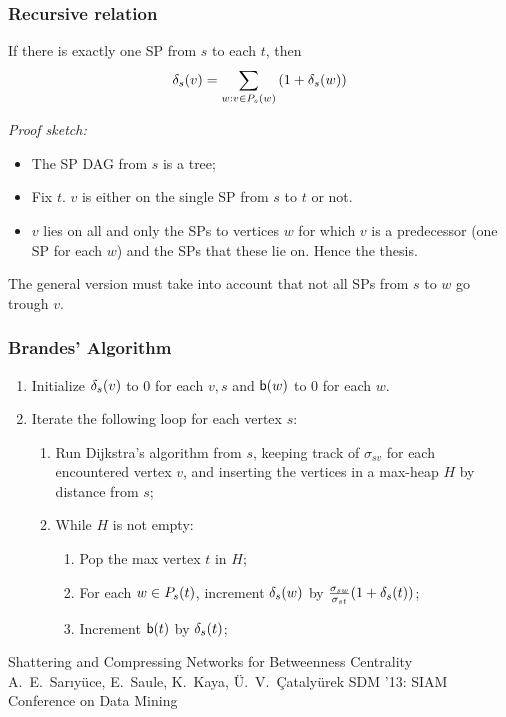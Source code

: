 \begin{frame}
  \frametitle{Recursive relation}
  \begin{theorem}
    If there is exactly one SP from $s$ to each $t$, then
    \[
      \delta_s(v)=\sum_{w: v\in P_s(w)}\left(1+\delta_s(w)\right)
    \]
  \end{theorem}
  \pause
  \emph{Proof sketch:}
  \begin{itemize}
    \item The SP DAG from $s$ is a tree;
    \item Fix $t$. $v$ is either on the single SP from $s$ to $t$ or not.
    \item $v$ lies on all and only the SPs to vertices $w$ for which $v$ is a
      predecessor (one SP for each $w$) and the SPs that these lie on. Hence the
      thesis.
  \end{itemize}
  \pause
  The general version must take into account that not all SPs from $s$ to $w$ go
  trough $v$.
\end{frame}

\begin{frame}
  \frametitle{Brandes' Algorithm}
  \begin{enumerate}
    \item Initialize $\delta_s(v)$ to $0$ for each $v,s$ and $\mathsf{b}(w)$ to $0$ for
      each $w$.
    \item Iterate the following loop for each vertex $s$:
      \begin{enumerate}
        \item Run Dijkstra's algorithm from $s$, keeping track of $\sigma_{sv}$ for
          each encountered vertex $v$, and inserting the vertices in a max-heap $H$ by
          distance from $s$;
        \item While $H$ is not empty:
          \begin{enumerate}
            \item Pop the max vertex $t$ in $H$;
            \item For each $w\in P_s(t)$, increment $\delta_s(w)$ by
              $\frac{\sigma_{sw}}{\sigma_{st}}(1+\delta_s(t))$;
            \item Increment $\mathsf{b}(t)$ by $\delta_s(t)$;
          \end{enumerate}
      \end{enumerate}
  \end{enumerate}
\end{frame}

\begin{frame}
  \centering
  \vfill
  {\huge Shattering and Compressing Networks for Betweenness Centrality}
  \vfill
  {\Large A.~E.~Sar\i y\"uce, E.~Saule, K.~Kaya, \"U.~V.~\c{C}ataly\"urek}
  \vfill
  {\large SDM '13: SIAM Conference on Data Mining}
  \vfill
\end{frame}

